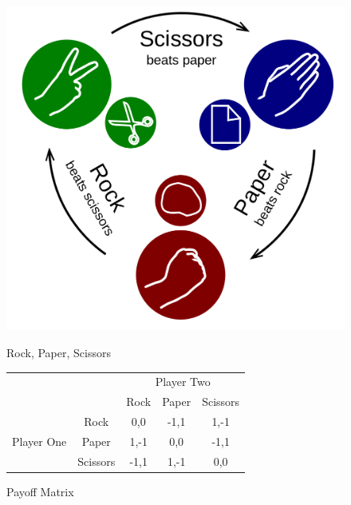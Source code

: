 \documentclass[a4paper, 11pt]{article}
\begin{document}
\begin{figure}[H]
  \begin{minipage}[b]{0.40\linewidth}
\includegraphics[width=1\linewidth]{Rock-paper-scissors}
\caption{Rock, Paper, Scissors}
  \end{minipage}%
  \begin{minipage}[b]{0.60\linewidth}
    \centering%
\begin{tabular}{cc|c|c|c|}
\cline{3-5}
                                                  &          & \multicolumn{3}{c|}{Player Two} \\ \cline{3-5} 
                                                  &          & Rock    & Paper    & Scissors   \\ \hline
\multicolumn{1}{|c|}{\multirow{3}{*}{Player One}} & Rock     & 0,0     & -1,1     & 1,-1       \\ \cline{2-5} 
\multicolumn{1}{|c|}{}                            & Paper    & 1,-1    & 0,0      & -1,1       \\ \cline{2-5} 
\multicolumn{1}{|c|}{}                            & Scissors & -1,1    & 1,-1     & 0,0        \\ \hline
\end{tabular}
\caption{Payoff Matrix}
    \par\vspace{0pt}
  \end{minipage}
\end{figure}
\end{document}

